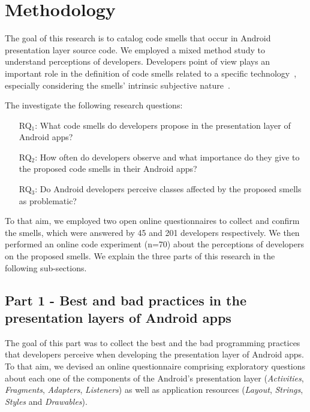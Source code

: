 \section{Methodology}

The goal of this research is to catalog code smells that occur in Android presentation layer source code. We employed a mixed method study to understand perceptions of developers. Developers point of view plays an important role in the definition of code smells related to a specific technology~\cite{arcverde2011understanding, Palomba_Do_2014, yamashita2013developers}, especially considering the smells' intrinsic subjective nature~\cite{JavascriptSmells, JavaQADetectingSmells:02}.

The investigate the following research questions:

\begin{itemize}
	\item[RQ$_1$:] What code smells do developers propose in the presentation layer of Android apps?

	\item[RQ$_2$:] How often do developers observe and what importance do they give to the proposed code smells in their Android apps?

	\item[RQ$_3$:] Do Android developers perceive classes affected by the proposed smells as problematic?
\end{itemize}

To that aim, we employed two open online questionnaires to collect and confirm the smells, which were answered by 45 and 201 developers respectively. We then performed an online code experiment (n=70) about the perceptions of developers on the proposed smells. 
We explain the three parts of this research in the following sub-sections.

\subsection{Part 1 - Best and bad practices in the presentation layers of Android apps}
\label{etapa-1}

The goal of this part was to collect the best and the bad programming practices 
that developers perceive when developing the presentation layer of Android apps.
To that aim, we devised an online questionnaire comprising exploratory questions
about each one of the components of the Android's presentation layer 
(\textit{Activities}, \textit{Fragments}, \textit{Adapters}, \textit{Listeners}) 
as well as application resources (\textit{Layout}, \textit{Strings}, 
\textit{Styles} and \textit{Drawables}). 


